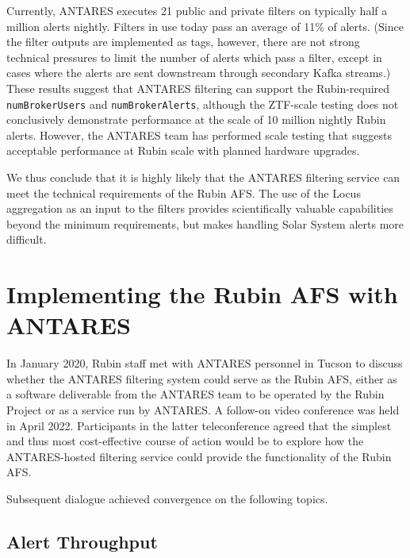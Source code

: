 \documentclass[DM,authoryear,toc]{lsstdoc}
\begin{document}
Currently, ANTARES executes 21 public and private filters on typically half a million alerts nightly.
Filters in use today pass an average of 11\% of alerts.
(Since the filter outputs are implemented as tags, however, there are not strong technical pressures to limit the number of alerts which pass a filter, except in cases where the alerts are sent downstream through secondary Kafka streams.)
These results suggest that ANTARES filtering can support the Rubin-required \texttt{numBrokerUsers} and \texttt{numBrokerAlerts}, although the ZTF-scale testing does not conclusively demonstrate performance at the scale of 10 million nightly Rubin alerts.
However, the ANTARES team has performed scale testing that suggests acceptable performance at Rubin scale with planned hardware upgrades.

We thus conclude that it is highly likely that the ANTARES filtering service can meet the technical requirements of the Rubin AFS.
The use of the Locus aggregation as an input to the filters provides scientifically valuable capabilities beyond the minimum requirements, but makes handling Solar System alerts more difficult.



\section{Implementing the Rubin AFS with ANTARES} \label{sec:implementation}

In January 2020, Rubin staff 
met with ANTARES personnel %
in Tucson to discuss whether the ANTARES filtering system could serve as the Rubin AFS, either as a software deliverable from the ANTARES team to be operated by the Rubin Project or as a service run by ANTARES.
A follow-on video conference was held in April 2022.
Participants in the latter teleconference agreed that the simplest and thus most cost-effective course of action would be to explore how the ANTARES-hosted filtering service could provide the functionality of the Rubin AFS.

Subsequent dialogue achieved convergence on the following topics.

\subsection{Alert Throughput}
\end{document}
